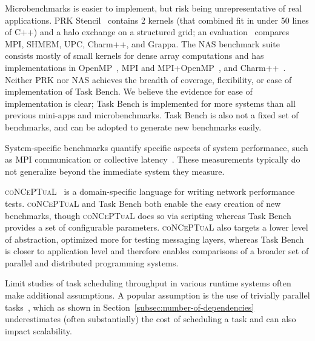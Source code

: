 Microbenchmarks is easier to implement, but risk being
unrepresentative of real applications. 
PRK Stencil~\cite{PRK14}
contains 2 kernels (that combined fit in under 50 lines of C++)
and a halo exchange on a structured grid; an
evaluation~\cite{PRKRuntimes16} compares MPI, SHMEM, UPC,
Charm++, and Grappa. The NAS benchmark suite~\cite{NAS91, NAS95}
consists mostly of small kernels for dense array computations and has
implementations in OpenMP~\cite{NASOpenMP99}, MPI and
MPI+OpenMP~\cite{NASMPIOpenMP00}, and
Charm++~\cite{NASCharm96}. Neither PRK nor NAS achieves the breadth of
coverage, flexibility, or ease of implementation of Task Bench. We
believe the evidence for ease of implementation is clear; Task Bench
is implemented for more systems than all previous mini-apps and
microbenchmarks. Task Bench is also not a fixed set of benchmarks, and
can be adopted to generate new benchmarks easily.

System-specific benchmarks quantify specific aspects
of system performance, such as MPI communication or collective
latency~\cite{MPPTest99, MPIBench01}. These measurements typically do
not generalize beyond the immediate system they measure.

\textsc{coNCePTuaL}~\cite{Conceptual07} is a domain-specific language
for writing network performance tests. \textsc{coNCePTuaL} and Task
Bench both enable the easy creation of new benchmarks, though
\textsc{coNCePTuaL} does so via scripting whereas Task Bench provides
a set of configurable parameters. \textsc{coNCePTuaL} also targets a
lower level of abstraction, optimized more for testing messaging
layers, whereas Task Bench is closer to application level and
therefore enables comparisons of a broader set of parallel and
distributed programming systems.

Limit studies of task scheduling throughput in various runtime systems
often make additional assumptions. A popular assumption is the use of
trivially parallel tasks~\cite{Canary16, Armstrong14}, which as shown
in Section~\ref{subsec:number-of-dependencies} underestimates (often
substantially) the cost of scheduling a task and can also impact scalability.
